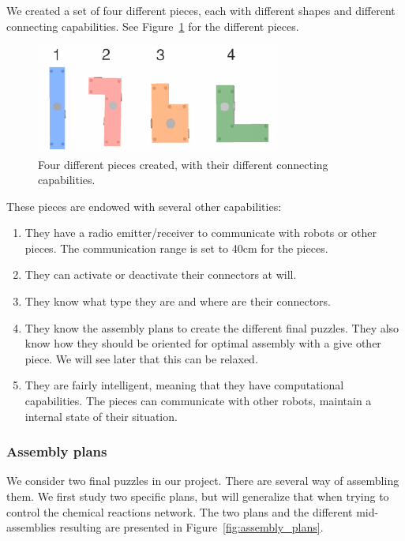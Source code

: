 		We created a set of four different pieces, each with different shapes and different connecting capabilities. See Figure~\ref{fig:pieces_types} for the different pieces.
		
		\begin{figure}[h]
			\centering
				\includegraphics[width=8cm]{img/pieces_types.pdf}
			\caption{Four different pieces created, with their different connecting capabilities.}
			\label{fig:pieces_types}
		\end{figure}
		
		These pieces are endowed with several other capabilities:
		\begin{enumerate}
			\item They have a radio emitter/receiver to communicate with robots or other pieces. The communication range is set to 40cm for the pieces.
			\item They can activate or deactivate their connectors at will.
			\item They know what type they are and where are their connectors.
			\item They know the assembly plans to create the different final puzzles. They also know how they should be oriented for optimal assembly with a give other piece. We will see later that this can be relaxed.
			\item They are fairly intelligent, meaning that they have computational capabilities. The pieces can communicate with other robots, maintain a internal state of their situation.
		\end{enumerate}
		
		\subsubsection{Assembly plans} %
		\label{ssub:assembly_plans}
			We consider two final puzzles in our project. There are several way of assembling them. We first study two specific plans, but will generalize that when trying to control the chemical reactions network. The two plans and the different mid-assemblies resulting are presented in Figure~\ref{fig:assembly_plans}.
			
